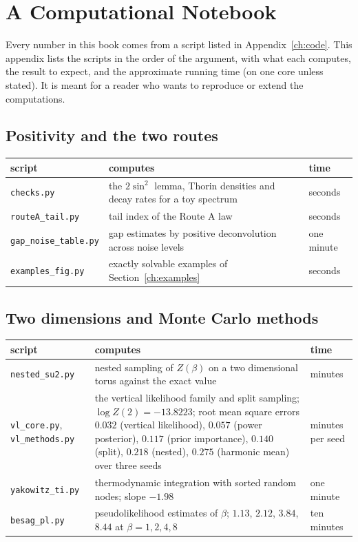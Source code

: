 \chapter{A Computational Notebook}\label{ch:notebook}

Every number in this book comes from a script listed in Appendix~\ref{ch:code}. This appendix lists the scripts in the order of the argument, with what each computes, the result to expect, and the approximate running time (on one core unless stated). It is meant for a reader who wants to reproduce or extend the computations.

\section{Positivity and the two routes}
\begin{center}
\footnotesize
\begin{tabular}{p{1.3in}p{2.05in}p{0.7in}}
\toprule
script & computes & time \\ \midrule
\texttt{checks.py} & the $2\sin^2$ lemma, Thorin densities and decay rates for a toy spectrum & seconds \\
\texttt{routeA\_tail.py} & tail index of the Route A law & seconds \\
\texttt{gap\_noise\_}\allowbreak\texttt{table.py} & gap estimates by positive deconvolution across noise levels & one minute \\
\texttt{examples\_fig.py} & exactly solvable examples of Section~\ref{ch:examples} & seconds \\
\bottomrule
\end{tabular}
\end{center}

\section{Two dimensions and Monte Carlo methods}
\begin{center}
\footnotesize
\begin{tabular}{p{1.3in}p{2.05in}p{0.7in}}
\toprule
script & computes & time \\ \midrule
\texttt{nested\_su2.py} & nested sampling of $Z(\beta)$ on a two dimensional torus against the exact value & minutes \\
\texttt{vl\_core.py}, \texttt{vl\_methods.py} & the vertical likelihood family and split sampling; $\log Z(2)=-13.8223$; root mean square errors $0.032$ (vertical likelihood), $0.057$ (power posterior), $0.117$ (prior importance), $0.140$ (split), $0.218$ (nested), $0.275$ (harmonic mean) over three seeds & minutes per seed \\
\texttt{yakowitz\_ti.py} & thermodynamic integration with sorted random nodes; slope $-1.98$ & one minute \\
\texttt{besag\_pl.py} & pseudolikelihood estimates of $\beta$; $1.13$, $2.12$, $3.84$, $8.44$ at $\beta=1,2,4,8$ & ten minutes \\
\bottomrule
\end{tabular}
\end{center}

